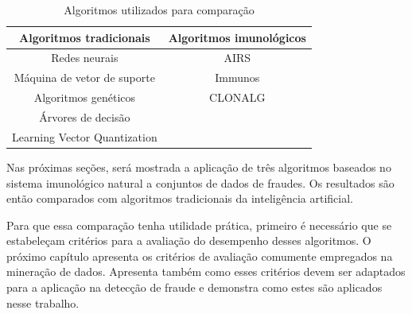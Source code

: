 \vspace{0.5cm}
\begin{table}[h]
    \centering
    \caption{Algoritmos utilizados para comparação}
    \label{tbl:ais_algs}
    \vspace{0.5cm}
    \begin{tabular}{c c}
        \hline
        Algoritmos tradicionais & Algoritmos imunológicos   \\
        \hline
        Redes neurais                & AIRS    \\
        Máquina de vetor de suporte  & Immunos \\
        Algoritmos genéticos         & CLONALG \\
        Árvores de decisão           &         \\

        Learning Vector Quantization &         \\
        \hline
    \end{tabular}
\end{table}
\vspace{0.5cm}

Nas próximas seções, será mostrada a aplicação de três algoritmos baseados no sistema imunológico natural a conjuntos de dados de fraudes. Os resultados são então comparados com algoritmos tradicionais da inteligência artificial.

Para que essa comparação tenha utilidade prática, primeiro é necessário que se estabeleçam critérios para a avaliação do desempenho desses algoritmos. O próximo capítulo apresenta os critérios de avaliação comumente empregados na mineração de dados. Apresenta também como esses critérios devem ser adaptados para a aplicação na detecção de fraude e demonstra como estes são aplicados nesse trabalho.
